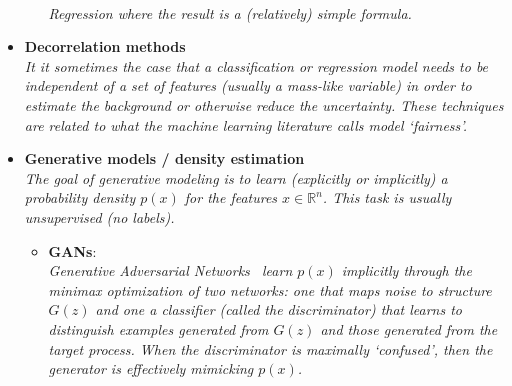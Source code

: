 \documentclass[12pt,letterpaper]{article}
\begin{document}
\begin{itemize}
\begin{itemize}
		\\\textit{Regression where the result is a (relatively) simple formula.}
	\end{itemize}
\item \textbf{Decorrelation methods}~\cite{Louppe:2016ylz,Dolen:2016kst,Moult:2017okx,Stevens:2013dya,Shimmin:2017mfk,Bradshaw:2019ipy,ATL-PHYS-PUB-2018-014,DiscoFever,Xia:2018kgd,Englert:2018cfo,Wunsch:2019qbo,Rogozhnikov:2014zea,10.1088/2632-2153/ab9023,clavijo2020adversarial,Kasieczka:2020pil,Kitouni:2020xgb,Ghosh:2021hrh}
\\\textit{It it sometimes the case that a classification or regression model needs to be independent of a set of features (usually a mass-like variable) in order to estimate the background or otherwise reduce the uncertainty.  These techniques are related to what the machine learning literature calls model `fairness'.}
\item \textbf{Generative models / density estimation}
\\\textit{The goal of generative modeling is to learn (explicitly or implicitly) a probability density $p(x)$ for the features $x\in\mathbb{R}^n$.  This task is usually unsupervised (no labels).}
	\begin{itemize}
		\item \textbf{GANs}:~\cite{deOliveira:2017pjk,Paganini:2017hrr,Paganini:2017dwg,Alonso-Monsalve:2018aqs,Butter:2019eyo,Martinez:2019jlu,Bellagente:2019uyp,Vallecorsa:2019ked,SHiP:2019gcl,Carrazza:2019cnt,Butter:2019cae,Lin:2019htn,DiSipio:2019imz,Hashemi:2019fkn,Chekalina:2018hxi,ATL-SOFT-PUB-2018-001,Zhou:2018ill,Carminati:2018khv,Vallecorsa:2018zco,Datta:2018mwd,Musella:2018rdi,Erdmann:2018kuh,Deja:2019vcv,Derkach:2019qfk,Erbin:2018csv,Erdmann:2018jxd,Urban:2018tqv,Oliveira:DLPS2017,deOliveira:2017rwa,Farrell:2019fsm,Hooberman:DLPS2017,Belayneh:2019vyx,buhmann2020getting,Alanazi:2020jod,2009.03796,2008.06545,Kansal:2020svm,Maevskiy:2020ank,Lai:2020byl,Choi:2021sku,Rehm:2021zow,Rehm:2021zoz,Carrazza:2021hny,Rehm:2021qwm,Lebese:2021foi,Winterhalder:2021ave,Kansal:2021cqp,NEURIPS2020_a878dbeb,Khattak:2021ndw,Mu:2021nno,Li:2021cbp,Bravo-Prieto:2021ehz,Anderlini:2021qpm}
		\\\textit{Generative Adversarial Networks~\cite{Goodfellow:2014upx} learn $p(x)$ implicitly through the minimax optimization of two networks: one that maps noise to structure $G(z)$ and one a classifier (called the discriminator) that learns to distinguish examples generated from $G(z)$ and those generated from the target process.  When the discriminator is maximally `confused', then the generator is effectively mimicking $p(x)$.}

\end{itemize}
\end{itemize}
\end{document}
